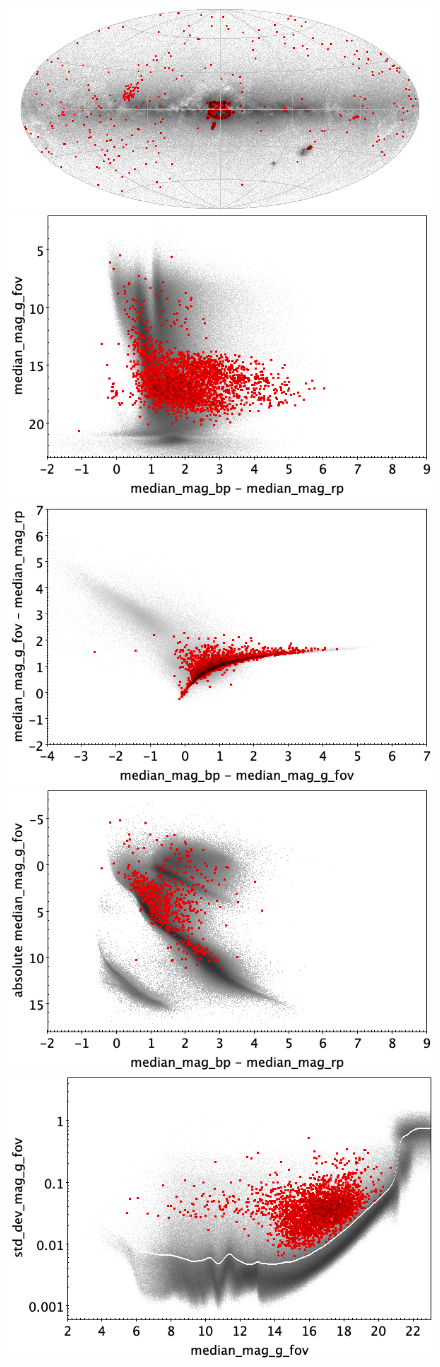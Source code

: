 \documentclass[longauth]{aa}
\begin{document}
\begin{appendix}
\begin{figure}
\centering
{} \includegraphics[width=0.6\hsize]{figures/appendix/ELL_trn_sky.png} \\ %
\vspace{4mm}
 \includegraphics[width=0.45\hsize]{figures/appendix/ELL_trn_cm.png}  %
\hspace{2mm}
 \includegraphics[width=0.45\hsize]{figures/appendix/ELL_trn_cc.png} \\ %
\vspace{4mm}
 \includegraphics[width=0.45\hsize]{figures/appendix/ELL_trn_cam.png}  %
\hspace{2mm}
 \includegraphics[width=0.45\hsize]{figures/appendix/ELL_trn_msd.png} \\ %

\end{figure}
\end{appendix}
\end{document}
